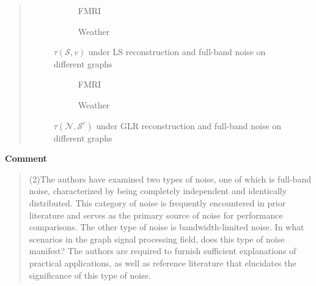 \documentclass[11pt,onecolumn,journal]{IEEEtran}
\theoremstyle{definition}
\newcommand{\set}[1]{\mathcal{#1}}
\begin{document}
\begin{quote}
\begin{figure}[h!]%
    \centering
    \begin{subfigure}{0.4\columnwidth}
    \caption{FMRI}
    \label{r2tau_FMRI_LS_}
    \end{subfigure}\hfill
    \begin{subfigure}{0.4\columnwidth}
    \caption{Weather}
    \label{r2GLR_MSE_subfigb}%
    \end{subfigure}
    
    \caption{$\tau(\set{S},v)$ under LS reconstruction and full-band noise on different graphs }
\label{r2fig:LS_tau_real}
\end{figure}

\begin{figure}[h!]%
    \centering
    \begin{subfigure}{0.4\columnwidth}
    \caption{FMRI}
    \label{r2tau_FMRI_LS}
    \end{subfigure}\hfill
    \begin{subfigure}{0.4\columnwidth}
    \caption{Weather}
    \label{GLR_MSE_subfigb}%
    \end{subfigure}
    \caption{$\tau(\set{N},\set{S}^{c})$ under GLR reconstruction and full-band noise on different graphs }
\label{r2fig:GLR_tau_real}
\end{figure}


\end{quote}
\newpage
\textbf{Comment}
\begin{quote}
(2)The authors have examined two types of noise, one of which is full-band noise, characterized by being completely independent and identically distributed. This category of noise is frequently encountered in prior literature and serves as the primary source of noise for performance comparisons. The other type of noise is bandwidth-limited noise. In what scenarios in the graph signal processing field, does this type of noise manifest? The authors are required to furnish sufficient explanations of practical applications, as well as reference literature that elucidates the significance of this type of noise.
\end{quote}
\end{document}
